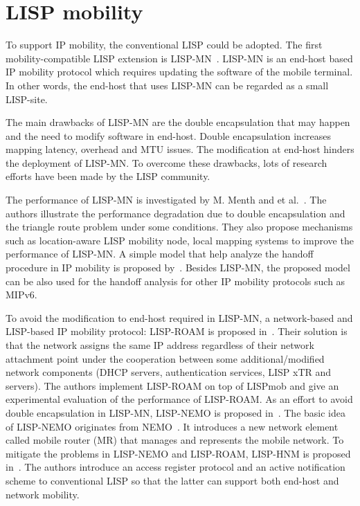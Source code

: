 \section{LISP mobility}
\label{sec:mobility}

To support IP mobility, the conventional LISP could be adopted. The first mobility-compatible LISP extension is LISP-MN~\cite{mn00}\cite{natal2013lisp}. LISP-MN is an end-host based IP mobility protocol which requires updating the software of the mobile terminal. In other words, the end-host that uses LISP-MN can be regarded as a small LISP-site.

The main drawbacks of LISP-MN are the double encapsulation that may happen and the need to modify software in end-host. Double encapsulation increases mapping latency, overhead and MTU issues. The modification at end-host hinders the deployment of LISP-MN. To overcome these drawbacks, lots of research efforts have been made by the LISP community.

The performance of LISP-MN is investigated by M. Menth and et al.~\cite{menth2010improvements}. The authors illustrate the performance degradation due to double encapsulation and the triangle route problem under some conditions. They also propose mechanisms such as location-aware LISP mobility node, local mapping systems to improve the performance of LISP-MN. A simple model that help analyze the handoff procedure in IP mobility is proposed by~\cite{phoomikiattisak2016control}. Besides LISP-MN, the proposed model can be also used for the handoff analysis for other IP mobility protocols such as MIPv6. 

To avoid the modification to end-host required in LISP-MN, a network-based and LISP-based IP mobility protocol: LISP-ROAM is proposed in~\cite{galvani2014lisp}. Their solution is that the network assigns the same IP address regardless of their network attachment point under the cooperation between some additional/modified network components (DHCP servers, authentication services, LISP xTR and servers). The authors implement LISP-ROAM on top of LISPmob and give an experimental evaluation of the performance of LISP-ROAM. As an effort to avoid double encapsulation in LISP-MN, LISP-NEMO is proposed in~\cite{wu2014nemo}. The basic idea of LISP-NEMO originates from NEMO~\cite{jeon2010network}. It introduces a new network element called mobile router (MR) that manages and represents the mobile network. To mitigate the problems in LISP-NEMO and LISP-ROAM, LISP-HNM is proposed in~\cite{tang2017lisp}. The authors introduce an access register protocol and an active
notification scheme to conventional LISP so that the latter can support both end-host and network mobility.

